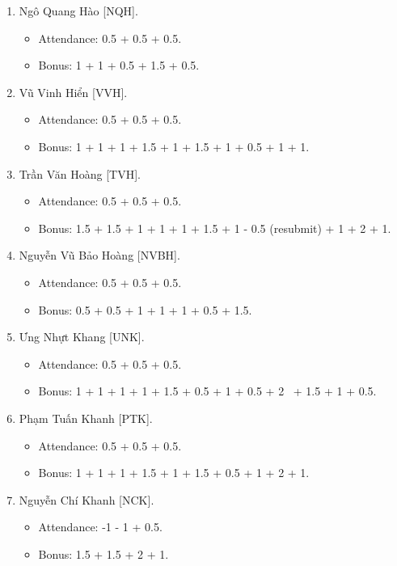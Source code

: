 \documentclass{article}
\begin{document}
\begin{enumerate}
\begin{itemize}
    \end{itemize}
    \item {\sc Ngô Quang Hào [NQH].}
    \begin{itemize}
        \item Attendance: 0.5 + 0.5 + 0.5.
        \item Bonus: 1 + 1 + 0.5 + 1.5 + 0.5.
    \end{itemize}
    \item {\sc Vũ Vinh Hiển [VVH].}
    \begin{itemize}
        \item Attendance: 0.5 + 0.5 + 0.5.
        \item Bonus: 1 + 1 + 1 + 1.5 + 1 + 1.5 + 1 + 0.5 + 1 + 1.
    \end{itemize}
    \item {\sc Trần Văn Hoàng [TVH].}
    \begin{itemize}
        \item Attendance: 0.5 + 0.5 + 0.5.
        \item Bonus: 1.5 + 1.5 + 1 + 1 + 1 + 1.5 + 1 - 0.5 (resubmit) + 1 + 2 + 1.
    \end{itemize}
    \item {\sc Nguyễn Vũ Bảo Hoàng [NVBH].}
    \begin{itemize}
        \item Attendance: 0.5 + 0.5 + 0.5.
        \item Bonus: 0.5 + 0.5 + 1 + 1 + 1 + 0.5 + 1.5.
    \end{itemize}
    \item {\sc Ưng Nhựt Khang [UNK].}
    \begin{itemize}
        \item Attendance: 0.5 + 0.5 + 0.5.
        \item Bonus: 1 + 1 + 1 + 1 + 1.5 + 0.5 + 1 + 0.5 + 2  + 1.5 + 1 + 0.5.
    \end{itemize}
    \item {\sc Phạm Tuấn Khanh [PTK].}
    \begin{itemize}
        \item Attendance: 0.5 + 0.5 + 0.5.
        \item Bonus: 1 + 1 + 1 + 1.5 + 1 + 1.5 + 0.5 + 1 + 2 + 1.
    \end{itemize}
    \item {\sc Nguyễn Chí Khanh [NCK].}
    \begin{itemize}
        \item Attendance: -1 - 1 + 0.5.
        \item Bonus: 1.5 + 1.5 + 2 + 1.

\end{itemize}
\end{enumerate}
\end{document}
